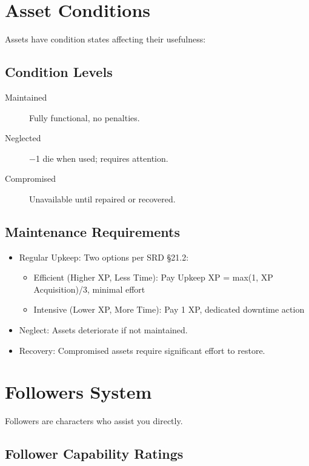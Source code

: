 \documentclass[11pt,twoside,openany]{book}
\begin{document}
\section*{Asset Conditions} 

Assets have condition states affecting their usefulness:

\subsection*{Condition Levels}

\begin{description}
\item[Maintained] Fully functional, no penalties.
\item[Neglected] −1 die when used; requires attention.
\item[Compromised] Unavailable until repaired or recovered.
\end{description}

\subsection*{Maintenance Requirements}

\begin{itemize}
\item Regular Upkeep: Two options per SRD §21.2:
\begin{itemize}
\item Efficient (Higher XP, Less Time): Pay Upkeep XP = max(1, XP Acquisition)/3, minimal effort
\item Intensive (Lower XP, More Time): Pay 1 XP, dedicated downtime action
\end{itemize}
\item Neglect: Assets deteriorate if not maintained.
\item Recovery: Compromised assets require significant effort to restore.
\end{itemize}

\section*{Followers System} 

Followers are characters who assist you directly.

\subsection*{Follower Capability Ratings}
\end{document}
